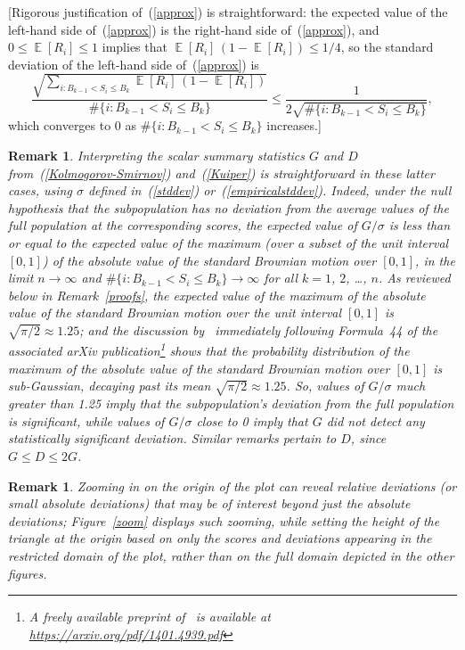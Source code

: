 \documentclass{article}
\newtheorem{remark1}[theorem]{Remark}
\newenvironment{remark}{\begin{remark1} \rm}{\end{remark1}}
\DeclareMathOperator{\E}{\mathop{}\mathbb{E}}
\begin{document}
[Rigorous justification of~(\ref{approx}) is straightforward:
the expected value of the left-hand side of~(\ref{approx})
is the right-hand side of~(\ref{approx}), and
$0 \le \E[ R_i ] \le 1$ implies that $\E[ R_i ] \, (1-\E[ R_i ]) \le 1/4$, so
the standard deviation of the left-hand side of~(\ref{approx}) is
%
\begin{equation}
\frac{\sqrt{\sum_{i : B_{k-1} < S_i \le B_k} \E[ R_i ] \, (1-\E[ R_i ])}}
     {\#\{i : B_{k-1} < S_i \le B_k\}}
\le \frac{1}{2 \sqrt{\#\{i : B_{k-1} < S_i \le B_k\}}},
\end{equation}
%
which converges to 0 as $\#\{i : B_{k-1} < S_i \le B_k\}$ increases.]

\begin{remark}
\label{interpretation}
Interpreting the scalar summary statistics $G$ and $D$
from~(\ref{Kolmogorov-Smirnov}) and~(\ref{Kuiper}) is straightforward
in these latter cases, using $\sigma$ defined in~(\ref{stddev})
or~(\ref{empiricalstddev}).
Indeed, under the null hypothesis that the subpopulation has no deviation
from the average values of the full population at the corresponding scores,
the expected value of $G/\sigma$ is less than or equal to the expected value
of the maximum (over a subset of the unit interval $[0, 1]$)
of the absolute value of the standard Brownian motion over $[0, 1]$,
in the limit $n \to \infty$ and $\#\{i : B_{k-1} < S_i \le B_k\} \to \infty$
for all $k = 1$, $2$, \dots, $n$.
As reviewed below in Remark~\ref{proofs},
the expected value of the maximum of the absolute value
of the standard Brownian motion over the unit interval $[0, 1]$
is $\sqrt{\pi/2} \approx 1.25$; and the discussion by~\cite{masoliver}
immediately following Formula~44
of the associated arXiv publication\footnote{A freely available preprint
of~\cite{masoliver} is available at \url{https://arxiv.org/pdf/1401.4939.pdf}}
shows that the probability distribution of the maximum of the absolute value
of the standard Brownian motion over $[0, 1]$ is sub-Gaussian,
decaying past its mean $\sqrt{\pi/2} \approx 1.25$.
So, values of $G/\sigma$ much greater than 1.25 imply that
the subpopulation's deviation from the full population is significant,
while values of $G/\sigma$ close to 0 imply that
$G$ did not detect any statistically significant deviation.
Similar remarks pertain to $D$, since $G \le D \le 2G$.
\end{remark}

\begin{remark}
\label{zooming}
Zooming in on the origin of the plot can reveal relative deviations
(or small absolute deviations)
that may be of interest beyond just the absolute deviations;
Figure~\ref{zoom} displays such zooming, while setting the height
of the triangle at the origin based on only the scores and deviations appearing
in the restricted domain of the plot, rather than on the full domain depicted
in the other figures.
\end{remark}
\end{document}
